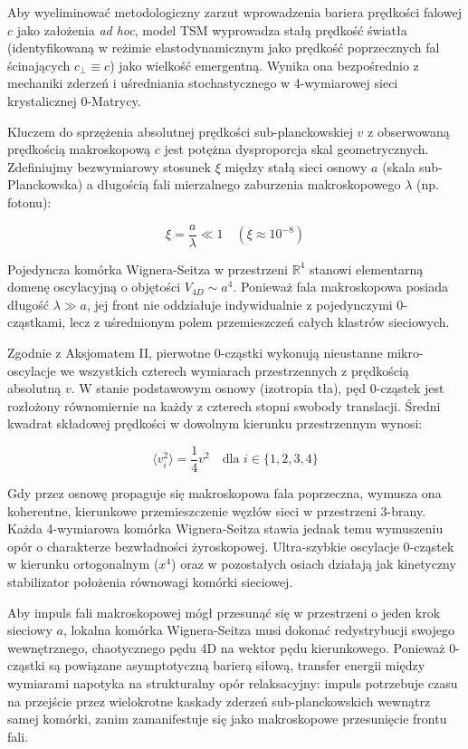 \documentclass[
  letterpaper,
  DIV=11,
  numbers=noendperiod]{scrartcl}
\numberwithin{equation}{subsection}
\begin{document}
Aby wyeliminować metodologiczny zarzut wprowadzenia bariera prędkości
falowej \(c\) jako założenia \emph{ad hoc}, model TSM wyprowadza stałą
prędkość światła (identyfikowaną w reżimie elastodynamicznym jako
prędkość poprzecznych fal ścinających \(c_{\perp} \equiv c\)) jako
wielkość emergentną. Wynika ona bezpośrednio z mechaniki zderzeń i
uśredniania stochastycznego w 4-wymiarowej sieci krystalicznej
0-Matrycy.

Kluczem do sprzężenia absolutnej prędkości sub-planckowskiej \(v\) z
obserwowaną prędkością makroskopową \(c\) jest potężna dysproporcja skal
geometrycznych. Zdefiniujmy bezwymiarowy stosunek \(\xi\) między stałą
sieci osnowy \(a\) (skala sub-Planckowska) a długością fali mierzalnego
zaburzenia makroskopowego \(\lambda\) (np. fotonu):

\[\tag{1.2.01} \xi = \frac{a}{\lambda} \ll 1 \quad \left(\xi \approx 10^{-8}\right)\]

Pojedyncza komórka Wignera-Seitza w przestrzeni \(\mathbb{R}^4\) stanowi
elementarną domenę oscylacyjną o objętości \(V_{4D} \sim a^4\). Ponieważ
fala makroskopowa posiada długość \(\lambda \gg a\), jej front nie
oddziałuje indywidualnie z pojedynczymi 0-cząstkami, lecz z uśrednionym
polem przemieszczeń całych klastrów sieciowych.

Zgodnie z Aksjomatem II, pierwotne 0-cząstki wykonują nieustanne
mikro-oscylacje we wszystkich czterech wymiarach przestrzennych z
prędkością absolutną \(v\). W stanie podstawowym osnowy (izotropia tła),
pęd 0-cząstek jest rozłożony równomiernie na każdy z czterech stopni
swobody translacji. Średni kwadrat składowej prędkości w dowolnym
kierunku przestrzennym wynosi:

\[\tag{1.2.02} \langle v_i^2 \rangle = \frac{1}{4} v^2 \quad \text{dla } i \in \{1, 2, 3, 4\}\]

Gdy przez osnowę propaguje się makroskopowa fala poprzeczna, wymusza ona
koherentne, kierunkowe przemieszczenie węzłów sieci w przestrzeni
3-brany. Każda 4-wymiarowa komórka Wignera-Seitza stawia jednak temu
wymuszeniu opór o charakterze bezwładności żyroskopowej. Ultra-szybkie
oscylacje 0-cząstek w kierunku ortogonalnym (\(x^4\)) oraz w pozostałych
osiach działają jak kinetyczny stabilizator położenia równowagi komórki
sieciowej.

Aby impuls fali makroskopowej mógł przesunąć się w przestrzeni o jeden
krok sieciowy \(a\), lokalna komórka Wignera-Seitza musi dokonać
redystrybucji swojego wewnętrznego, chaotycznego pędu 4D na wektor pędu
kierunkowego. Ponieważ 0-cząstki są powiązane asymptotyczną barierą
siłową, transfer energii między wymiarami napotyka na strukturalny opór
relaksacyjny: impuls potrzebuje czasu na przejście przez wielokrotne
kaskady zderzeń sub-planckowskich wewnątrz samej komórki, zanim
zamanifestuje się jako makroskopowe przesunięcie frontu fali.
\end{document}
